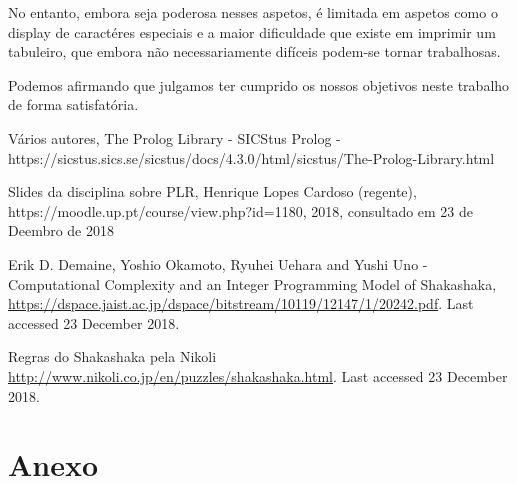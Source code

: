 \documentclass[runningheads]{llncs}
\begin{document}
No entanto, embora seja poderosa nesses aspetos, é limitada em aspetos como o display de caractéres especiais e a maior dificuldade que existe em imprimir um tabuleiro, que embora não necessariamente difíceis podem-se tornar trabalhosas. 

Podemos afirmando que julgamos ter cumprido os nossos objetivos neste trabalho de forma satisfatória.

%
%
%
% 
% 
%
\begin{thebibliography}{8}


Vários autores, The Prolog Library - SICStus Prolog - https://sicstus.sics.se/sicstus/docs/4.3.0/html/sicstus/The-Prolog-Library.html

Slides da disciplina sobre PLR, Henrique Lopes Cardoso (regente), https://moodle.up.pt/course/view.php?id=1180, 2018, consultado em 23 de Deembro de 2018

Erik D. Demaine, Yoshio Okamoto, Ryuhei Uehara and Yushi Uno - Computational Complexity and an Integer Programming Model of Shakashaka, \url{https://dspace.jaist.ac.jp/dspace/bitstream/10119/12147/1/20242.pdf}. Last accessed 23 December 2018.

Regras do Shakashaka pela Nikoli
\url{http://www.nikoli.co.jp/en/puzzles/shakashaka.html}. Last accessed 23 December 2018.

\end{thebibliography}

\section{Anexo}
\end{document}
